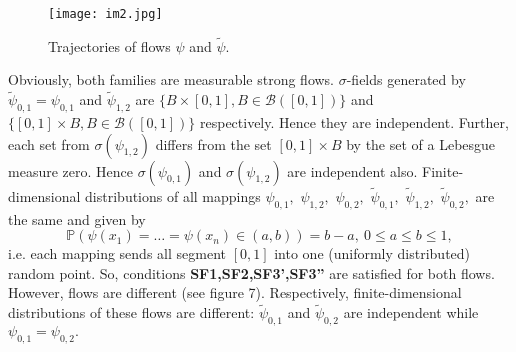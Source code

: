 \documentclass[a4paper,12pt]{article}
\newcommand{\1}{1\!\!\,{\rm I}}
\theoremstyle{plain}
\begin{document}
\begin{figure}[!h]
	\centering
	\caption{Trajectories of flows $\psi$ and $\tilde{\psi}.$}
	\texttt{[image: im2.jpg]}
\end{figure}

Obviously, both families are measurable strong flows.  $\sigma$-fields generated by $\tilde{\psi}_{0,1}=\psi_{0,1}$ and $\tilde{\psi}_{1,2}$ are $\{B\times[0,1], B\in \mathcal{B}([0,1])\}$ and $\{[0,1]\times B, B\in \mathcal{B}([0,1])\}$ respectively. Hence they are independent. Further, each set from  $\sigma(\psi_{1,2})$ differs from the set $[0,1]\times B$ by the set of a Lebesgue measure zero. Hence $\sigma(\psi_{0,1})$ and $\sigma(\psi_{1,2})$ are independent also. Finite-dimensional distributions of all mappings $\psi_{0,1},$ $\psi_{1,2},$ $\psi_{0,2},$ $\tilde{\psi}_{0,1},$ $\tilde{\psi}_{1,2},$ $\tilde{\psi}_{0,2},$  are the same and given by 
$$
\mathbb{P}(\psi(x_1)=\ldots=\psi(x_n)\in (a,b))=b-a, \ 0\leq a\leq b\leq 1,
$$
i.e. each mapping sends all segment $[0,1]$ into one (uniformly distributed) random point. 	So, conditions {\bf SF1,SF2,SF3',SF3''} are satisfied for both flows. However, flows are different (see figure 7). Respectively, finite-dimensional distributions of these flows are different: 
$\tilde{\psi}_{0,1}$ and $\tilde{\psi}_{0,2}$ are independent while $\psi_{0,1}=\psi_{0,2}.$
\end{document}
